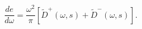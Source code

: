 \begin{equation} \label{ksy3} 
\frac{d e}{d\omega}=\frac{\omega ^2}{\pi} 
\left[ 
\tilde{D}^{+}(\omega , s )+ 
\tilde{D}^{-}(\omega , s ) 
\right]. 
\end{equation} 
